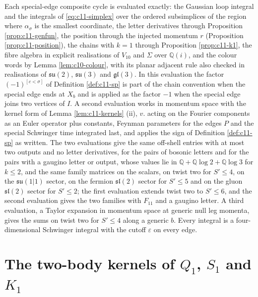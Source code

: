 \begin{remark}
\label{rem:c11-method}
Each special-edge composite cycle is evaluated exactly: the Gaussian loop integral and the integrals of \eqref{eq:c11-simplex} over the ordered subsimplices of the region where $\alpha_\sigma$ is the smallest coordinate, the letter derivatives through Proposition \ref{prop:c11-genfun}, the position through the injected momentum $r$ (Proposition \ref{prop:c11-position}), the chains with $k=1$ through Proposition \ref{prop:c11-k1}, the fibre algebra in explicit realisations of $V_{10}$ and $\Sigma$ over $\mathbb Q(i)$, and the colour words by Lemma \ref{lem:c10-colour}, with its planar adjacent rule also checked in realisations of $\mathfrak{su}(2)$, $\mathfrak{su}(3)$ and $\mathfrak{gl}(3)$. In this evaluation the factor $(-1)^{[c<\sigma]}$ of Definition \ref{def:c11-sp} is part of the chain convention when the special edge ends at $X_b$ and is applied as the factor $-1$ when the special edge joins two vertices of $I$. A second evaluation works in momentum space with the kernel form of Lemma \ref{lem:c11-kernels} (ii), $v.$ acting on the Fourier components as an Euler operator plus constants, Feynman parameters for the edges $P$ and the special Schwinger time integrated last, and applies the sign of Definition \ref{def:c11-sp} as written. The two evaluations give the same off-shell entries with at most two outputs and no letter derivatives, for the pairs of bosonic letters and for the pairs with a gaugino letter or output, whose values lie in $\mathbb Q+\mathbb Q\log2+\mathbb Q\log3$ for $k\le2$, and the same family matrices on the scalars, on twist two for $S'\le4$, on the $\mathfrak{su}(1|1)$ sector, on the fermion $\mathfrak{sl}(2)$ sector for $S'\le5$ and on the gluon $\mathfrak{sl}(2)$ sector for $S'\le2$; the first evaluation extends twist two to $S'\le6$, and the second evaluation gives the two families with $F_{11}$ and a gaugino letter. A third evaluation, a Taylor expansion in momentum space at generic null leg momenta, gives the sums on twist two for $S'\le4$ along a generic $b$. Every integral is a four-dimensional Schwinger integral with the cutoff $\varepsilon$ on every edge.
\end{remark}

\section{The two-body kernels of $Q_1$, $S_1$ and $K_1$}

